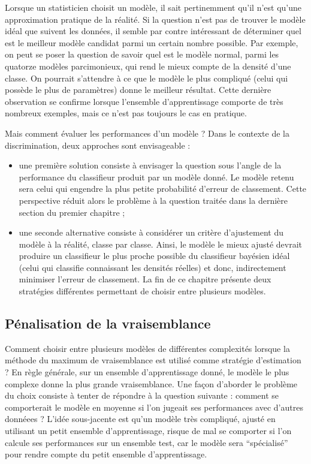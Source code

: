 Lorsque un statisticien choisit un mod\`ele, il sait pertinemment
qu'il n'est qu'une approximation pratique de la r\'ealit\'e. 
Si la question n'est pas de trouver le mod\`ele id\'eal que
suivent les donn\'ees, il semble par contre int\'eressant de 
d\'eterminer quel est le meilleur mod\`ele candidat parmi un
certain nombre possible. Par exemple, on peut se poser la question
de savoir quel est le mod\`ele normal,  parmi les quatorze
mod\`eles parcimonieux, qui rend le mieux compte de la densit\'e
d'une classe. On pourrait s'attendre \`a ce que  le mod\`ele le plus 
compliqu\'e (celui qui poss\`ede le plus de param\`etres) donne
le meilleur r\'esultat. Cette derni\`ere observation  se confirme  
lorsque l'ensemble d'apprentissage comporte de tr\`es nombreux
exemples, mais ce n'est pas toujours le cas en pratique. 

Mais comment \'evaluer les performances d'un mod\`ele ? Dans le contexte
de la discrimination, deux approches sont envisageable :  
\begin{itemize}
\item une premi\`ere solution consiste \`a envisager la question sous l'angle
de la performance du classifieur produit par un mod\`ele donn\'e.
 Le mod\`ele retenu
sera celui qui engendre la plus petite probabilit\'e d'erreur de 
classement.  Cette perspective r\'eduit alors le probl\`eme \`a la 
question trait\'ee dans la derni\`ere section du premier chapitre ;

\item une seconde alternative consiste \`a consid\'erer un crit\`ere
d'ajustement du mod\`ele \`a la r\'ealit\'e, classe par classe. Ainsi, 
le mod\`ele le mieux ajust\'e devrait produire un classifieur le 
plus proche possible du classifieur bay\'esien id\'eal (celui qui
classifie connaissant les densit\'es r\'eelles) et donc, indirectement
minimiser l'erreur de classement. La fin de ce chapitre pr\'esente deux strat\'egies
diff\'erentes permettant de choisir entre plusieurs mod\`eles.
\end{itemize}      


\subsection{P\'enalisation de la vraisemblance}

Comment choisir entre plusieurs mod\`eles de diff\'erentes complexit\'es
lorsque la m\'ethode du maximum de vraisemblance est utilis\'e
comme strat\'egie d'estimation ? En r\`egle g\'en\'erale, sur 
un ensemble d'apprentissage donn\'e, le mod\`ele le plus
complexe donne la plus grande vraisemblance. Une fa\c{c}on
d'aborder le  probl\`eme du choix consiste \`a tenter de 
r\'epondre \`a la question suivante : comment se comporterait
le mod\`ele en moyenne  si l'on jugeait ses performances avec d'autres
donn\'eees ?
L'id\'ee sous-jacente est qu'un mod\`ele tr\`es compliqu\'e,
ajust\'e en utilisant un petit ensemble d'apprentissage,
risque de mal se comporter si l'on calcule ses performances
sur un ensemble test, car le mod\`ele sera ``sp\'ecialis\'e''
pour rendre compte du petit ensemble d'apprentissage.  

